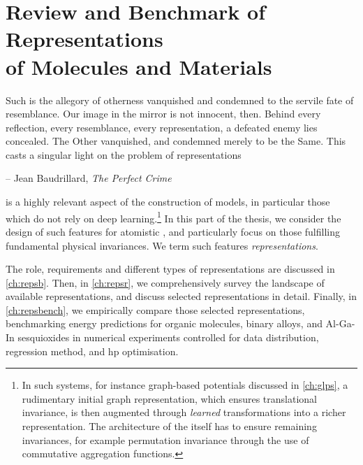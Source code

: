 

\part[Review and Benchmark of Representations\\ of Molecules and Materials]{Review and Benchmark of Representations\\ of Molecules and Materials}
\label{part:representations}

\thispagestyle{plain}
\begin{center}
  \begin{minipage}{0.8\textwidth}

    \vspace{4\baselineskip}

    Such is the allegory of otherness vanquished and condemned to the servile fate of resemblance. Our image in the mirror is not innocent, then. Behind every reflection, every resemblance, every representation, a defeated enemy lies concealed. The Other vanquished, and condemned merely to be the Same. This casts a singular light on the problem of representations \el

    \vspace{\baselineskip}
    {\hfill\raggedright -- Jean Baudrillard, \textit{The Perfect Crime}\hspace{0.25cm}}
  \end{minipage}
\end{center}
\vspace{2\baselineskip}

 is a highly relevant aspect of the construction of \ml models, in particular those which do not rely on deep learning.\footnote[][3\baselineskip]{In such systems, for instance graph-based potentials discussed in \cref{ch:glps}, a rudimentary initial graph representation, which ensures translational invariance, is then augmented through \emph{learned} transformations into a richer representation. The architecture of the \nn itself has to ensure remaining invariances, for example permutation invariance through the use of commutative aggregation functions.}
In this part of the thesis, we consider the design of such features for atomistic \ml, and particularly focus on those fulfilling fundamental physical invariances.
We term such features \emph{representations}. 

The role, requirements and different types of representations are discussed in \cref{ch:repsb}. Then, in \cref{ch:repsr}, we comprehensively survey the landscape of available representations, and discuss selected representations in detail. Finally, in \cref{ch:repsbench}, we empirically compare those selected representations, benchmarking energy predictions for organic molecules, binary alloys, and Al-Ga-In sesquioxides in numerical experiments controlled for data distribution, regression method, and \gls{hp} optimisation.

